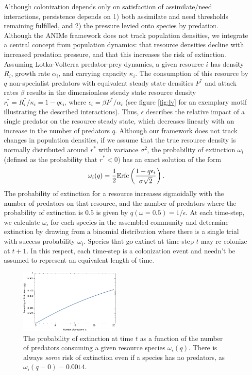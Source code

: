 \documentclass[twocolumn,preprintnumbers,amsmath,amssymb,superscriptaddress]{revtex4}
\begin{document}
Although colonization depends only on satisfaction of assimilate/need interactions, persistence depends on
1) both assimilate and need thresholds remaining fulfilled, and
2) the pressure levied onto species by predation.
Although the ANIMe framework does not track population densities, we integrate a central concept from population dynamics: that resource densities decline with increased predation pressure, and that this increases the risk of extinction.
Assuming Lotka-Volterra predator-prey dynamics, a given resource $i$ has density $R_i$, growth rate $\alpha_i$, and carrying capacity $\kappa_i$.
The consumption of this resource by $q$ non-specialist predators with equivalent steady state densities $P^*$ and attack rates $\beta$ results in the dimensionless steady state resource density $r_i^* = R_i^*/\kappa_i = 1 - q\epsilon_i$, where $\epsilon_i=\beta P^*/\alpha_i$ (see figure \ref{fig:lv} for an exemplary motif illustrating the described interactions).
Thus, $\epsilon$ describes the relative impact of a single predator on the resource steady state, which decreases linearly with an increase in the number of predators $q$.
Although our framework does not track changes in population densities, if we assume that the true resource density is normally distributed around $r^*$ with variance $\sigma^2$, the probability of extinction $\omega_i$ (defined as the probability that $r^* < 0$) has an exact solution of the form
\begin{equation}
  \omega_i(q) = \frac{1}{2}{\rm Erfc}\left(\frac{1-q\epsilon_i}{\sigma\sqrt{2}}\right).
\end{equation}
The probability of extinction for a resource increases sigmoidally with the number of predators on that resource, and the number of predators where the probability of extinction is $0.5$ is given by $q(\omega=0.5) = 1/\epsilon$.
At each time-step, we calculate $\omega_i$ for each species in the assembled community and determine extinction by drawing from a binomial distribution where there is a single trial with success probability $\omega_i$.
Species that go extinct at time-step $t$ may re-colonize at $t+1$.
In this respect, each time-step is a colonization event and needn't be assumed to represent an equivalent length of time.

\begin{figure}
\centering
\includegraphics[width=0.45\textwidth]{extinction.pdf}
\caption{
The probability of extinction at time $t$ as a function of the number of predators consuming a given resource species $\omega_i(q)$. There is always \emph{some} risk of extinction even if a species has no predators, as $\omega_i(q=0) = 0.0014$.
}
\label{fig:ext}
\end{figure} 
\end{document}
